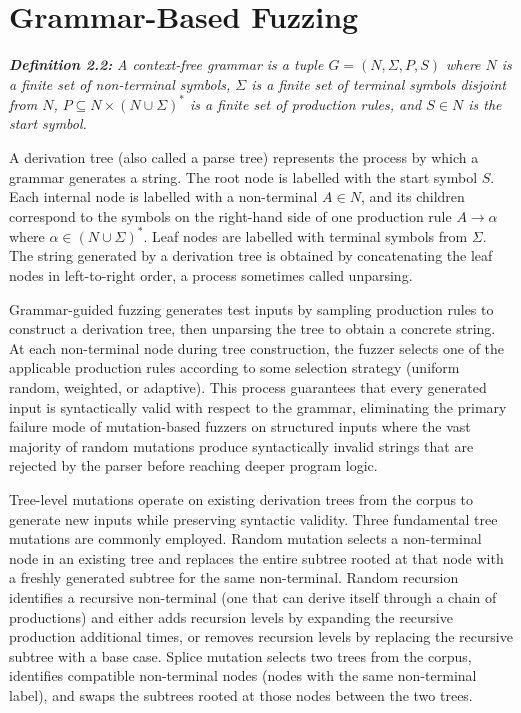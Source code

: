 \section{Grammar-Based Fuzzing}
\label{sec:bg-grammar-fuzzing}

\textbf{\textit{Definition 2.2:}} \textit{A context-free grammar is a tuple $G = (N, \Sigma, P, S)$ where $N$ is a finite set of non-terminal symbols, $\Sigma$ is a finite set of terminal symbols disjoint from $N$, $P \subseteq N \times (N \cup \Sigma)^*$ is a finite set of production rules, and $S \in N$ is the start symbol.}

A derivation tree (also called a parse tree) represents the process by which a grammar generates a string. The root node is labelled with the start symbol $S$. Each internal node is labelled with a non-terminal $A \in N$, and its children correspond to the symbols on the right-hand side of one production rule $A \to \alpha$ where $\alpha \in (N \cup \Sigma)^*$. Leaf nodes are labelled with terminal symbols from $\Sigma$. The string generated by a derivation tree is obtained by concatenating the leaf nodes in left-to-right order, a process sometimes called unparsing.

Grammar-guided fuzzing generates test inputs by sampling production rules to construct a derivation tree, then unparsing the tree to obtain a concrete string. At each non-terminal node during tree construction, the fuzzer selects one of the applicable production rules according to some selection strategy (uniform random, weighted, or adaptive). This process guarantees that every generated input is syntactically valid with respect to the grammar, eliminating the primary failure mode of mutation-based fuzzers on structured inputs where the vast majority of random mutations produce syntactically invalid strings that are rejected by the parser before reaching deeper program logic.

Tree-level mutations operate on existing derivation trees from the corpus to generate new inputs while preserving syntactic validity. Three fundamental tree mutations are commonly employed. Random mutation selects a non-terminal node in an existing tree and replaces the entire subtree rooted at that node with a freshly generated subtree for the same non-terminal. Random recursion identifies a recursive non-terminal (one that can derive itself through a chain of productions) and either adds recursion levels by expanding the recursive production additional times, or removes recursion levels by replacing the recursive subtree with a base case. Splice mutation selects two trees from the corpus, identifies compatible non-terminal nodes (nodes with the same non-terminal label), and swaps the subtrees rooted at those nodes between the two trees.

